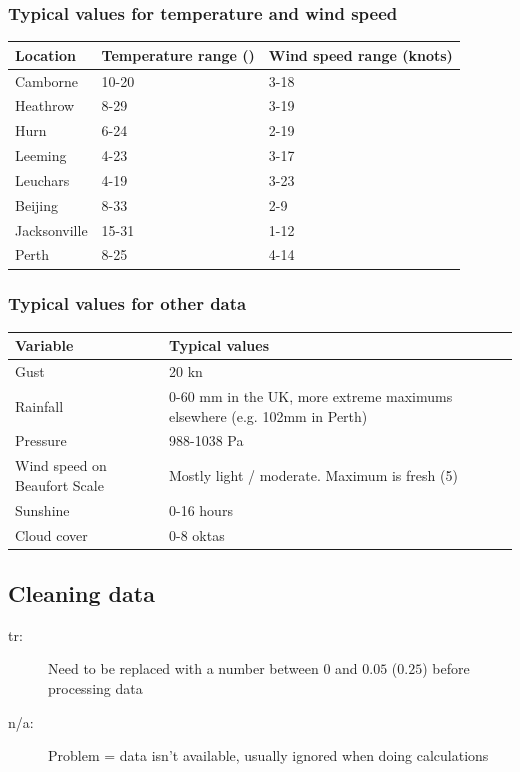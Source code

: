 \documentclass[A4paper, 11pt]{article}
\begin{document}
	\subsubsection{Typical values for temperature and wind speed}
	\begin{tabular}{|l|l|l|}
		\hline
		\textbf{Location} & \textbf{Temperature range (\textcelsius)}& \textbf{Wind speed range (knots)} \\
		\hline
		Camborne & 10-20 & 3-18 \\
		\hline
		Heathrow & 8-29 & 3-19 \\
		\hline
		Hurn & 6-24 & 2-19 \\
		\hline
		Leeming & 4-23 & 3-17 \\
		\hline
		Leuchars & 4-19 & 3-23 \\
		\hline
		Beijing & 8-33 & 2-9 \\
		\hline
		Jacksonville & 15-31 & 1-12 \\
		\hline
		Perth & 8-25 & 4-14 \\
		\hline
	\end{tabular}
	
	\subsubsection{Typical values for other data}
	\begin{tabular}{|p{4.8cm} | p{12.2cm}|}
		\hline
		\textbf{Variable} & \textbf{Typical values} \\
		\hline
		Gust & 20 kn \\
		\hline
		Rainfall & 0-60 mm in the UK, more extreme maximums elsewhere (e.g. 102mm in Perth) \\
		\hline
		Pressure & 988-1038 Pa \\
		\hline
		Wind speed on Beaufort Scale & Mostly light / moderate. Maximum is fresh (5) \\
		\hline
		Sunshine & 0-16 hours \\
		\hline
		Cloud cover & 0-8 oktas \\
		\hline
	\end{tabular}
	
	\subsection{Cleaning data}
	\begin{description}
		\item[tr:] Need to be replaced with a number between $0$ and $0.05$ ($0.25$) before processing data
		\item[n/a:] Problem = data isn't available, usually ignored when doing calculations
	\end{description}
	
\end{document}
